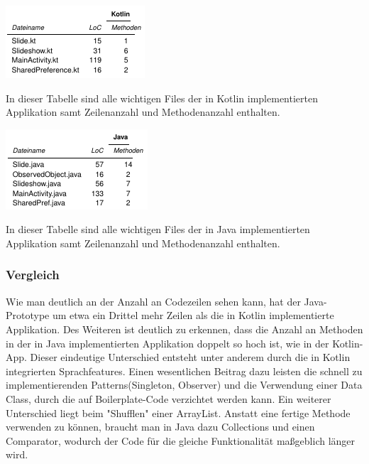 \documentclass{sigchi-ext}
\begin{document}
\begin{marginfigure}[-20pc]
  \begin{minipage}{\marginparwidth}
    \centering
    \includegraphics[width=1.05\marginparwidth]{figures/Kotlin-Tabelle.png}
    \caption{In dieser Tabelle sind alle wichtigen Files der in Kotlin implementierten Applikation samt Zeilenanzahl und Methodenanzahl enthalten.}
  \end{minipage}
\end{marginfigure}

\begin{marginfigure}[-3pc]
  \begin{minipage}{\marginparwidth}
    \centering
    \includegraphics[width=1.05\marginparwidth]{figures/Java-Tabelle.png}
    \caption{In dieser Tabelle sind alle wichtigen Files der in Java implementierten Applikation samt Zeilenanzahl und Methodenanzahl enthalten. }
  \end{minipage}
\end{marginfigure}

\subsubsection{Vergleich}
Wie man deutlich an der Anzahl an Codezeilen sehen kann, hat der Java-Prototype um etwa ein Drittel mehr Zeilen als die in Kotlin implementierte Applikation. Des Weiteren ist deutlich zu erkennen, dass die Anzahl an Methoden in der in Java implementierten Applikation doppelt so hoch ist, wie in der Kotlin-App.
Dieser eindeutige Unterschied entsteht unter anderem durch die in Kotlin integrierten Sprachfeatures. Einen wesentlichen Beitrag dazu leisten die schnell zu implementierenden Patterns(Singleton, Observer) und die Verwendung einer Data Class, durch die auf Boilerplate-Code verzichtet werden kann.
Ein weiterer Unterschied liegt beim "Shufflen" einer ArrayList. Anstatt eine fertige Methode verwenden zu können, braucht man in Java dazu Collections und einen Comparator, wodurch der Code für die gleiche Funktionalität maßgeblich länger wird.
\end{document}

